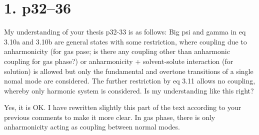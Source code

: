 \documentclass{exam}
\begin{document}
\section{1. p32--36}
\begin{questions}

%
\question My understanding of your thesis p32-33 is as follows:
Big psi and gamma in eq 3.10a and 3.10b are general states with some restriction, where coupling due to anharmonicity (for gas pase; is there any coupling other than anharmonic coupling for gas phase?) or anharmonicity + solvent-solute interaction (for solution) is allowed but only the fundamental and overtone transitions of a single nomal mode are considered. The further restriction by eq 3.11 allows no coupling, whereby only harmonic system is considered. Is my understanding like this right?

\begin{solution}
Yes, it is OK. I have rewritten slightly this part of the text according to your previous comments to make it more
clear. In gas phase, there is only anharmonicity acting as coupling between normal modes.
\end{solution}
\end{questions}
\end{document}
